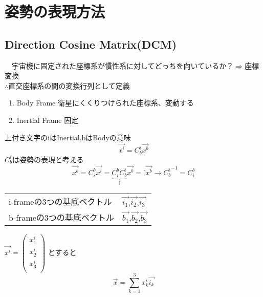 \documentclass[class=article, crop=false, preview=false, dvipdfmx, a4paper]{standalone}
\begin{document}
\section{姿勢の表現方法}

\subsection{Direction Cosine Matrix(DCM)}
　宇宙機に固定された座標系が慣性系に対してどっちを向いているか？$\Rightarrow$座標変換\\
 $\therefore$直交座標系の間の変換行列として定義
\begin{enumerate}[label = \maru{\theenumi}]
 \item Body Frame 衛星にくくりつけられた座標系、変動する 
 \item Inertial Frame 固定
 \end{enumerate}
 上付き文字のiはInertial,bはBodyの意味
 \[ \vec{x^i}=C^i_b\vec{x^b} \]
 $C^i_b$は姿勢の表現と考える
 \[ \vec{x^b} = C^b_i \vec{x^i} = \underbrace{C^b_i C^i_b}_{\mathbb{I}} \vec{x^b} = \mathbb{I} \vec{x^b}
 	\rightarrow {C^i_b}^{-1} = C^b_i \]

\begin{tabular}{ll}
i-frameの3つの基底ベクトル & $\vec{i_1}$,$\vec{i_2}$,$\vec{i_3}$ \\
b-frameの3つの基底ベクトル & $\vec{b_1}$,$\vec{b_2}$,$\vec{b_3}$
\end{tabular}

$\vec{x^i}=
 	\begin{pmatrix}
    	x^i_1\\
        x^i_2\\
        x^i_3\\
    \end{pmatrix}$
とすると
\begin{equation}
\vec{x} = \sum_{k=1}^{3} x^i_k \vec{i_k} \label{eq:1}
\end{equation}
\end{document}
